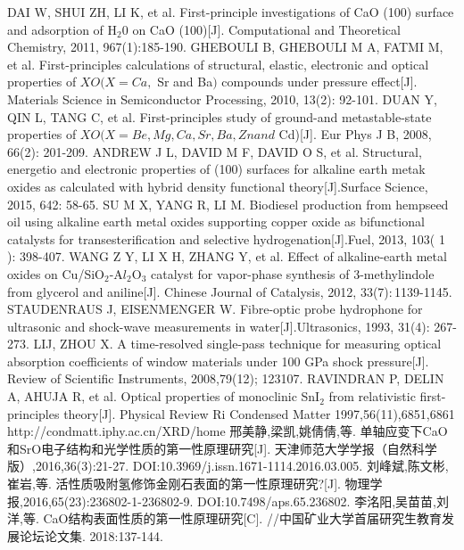 \documentclass[12pt,a4paper]{article}%
\begin{document}
	\begin{thebibliography}{99}%
		 DAI W, SHUI ZH, LI K, et al. First-principle investigations of CaO
		(100) surface and adsorption of H$_2$0 on CaO (100)[J]. Computational and Theoretical Chemistry, 2011, 967(1):185-190.
		 GHEBOULI B, GHEBOULI M A, FATMI M, et al. First-principles calculations of structural, elastic, electronic and optical properties of $XO ( X= Ca , $ Sr and Ba$) $ compounds under pressure effect[J]. Materials Science in Semiconductor Processing, 2010, 13(2): 92-101.
		 DUAN Y, QIN L, TANG C, et al. First-principles study of ground-and metastable-state properties of $XO(X=Be,Mg,Ca,Sr,Ba,Znand$ Cd)[J]. Eur Phys J B, 2008, 66(2): 201-209.
		  ANDREW J L, DAVID M F, DAVID O S, et al. Structural, energetio and electronic properties of (100) surfaces for alkaline earth metak oxides as calculated with hybrid density functional theory[J].Surface Science, 2015, 642: 58-65.
		  SU M X, YANG R, LI M. Biodiesel production from hempseed oil using alkaline earth metal oxides supporting copper oxide as bifunctional catalysts for transesterification and selective hydrogenation[J].Fuel, 2013, 103( 1 ): 398-407.
		 WANG Z Y, LI X H, ZHANG Y, et al. Effect of alkaline-earth metal oxides on Cu/SiO$_2$-A$l_2$O$_3$ catalyst for vapor-phase synthesis of 3-methylindole from glycerol and aniline[J]. Chinese Journal of Catalysis, 2012, 33(7)$\colon$1139-1145.
		 STAUDENRAUS J, EISENMENGER W. Fibre-optic probe hydrophone for ultrasonic and shock-wave measurements in water[J].Ultrasonics, 1993, 31(4): 267-273.
		 LIJ, ZHOU X. A time-resolved single-pass technique for measuring optical absorption coefficients of window materials under 100 GPa shock pressure[J]. Review of Scientific Instruments, 2008,79(12); 123107.
		  RAVINDRAN P, DELIN A, AHUJA R, et al. Optical properties of monoclinic SnI$_2$ from relativistic first-principles theory[J]. Physical Review Ri Condensed Matter 1997,56(11),6851,6861
		 http://condmatt.iphy.ac.cn/XRD/home
		 邢美静,梁凯,姚倩倩,等. 单轴应变下CaO和SrO电子结构和光学性质的第一性原理研究[J]. 天津师范大学学报（自然科学版）,2016,36(3):21-27. DOI:10.3969/j.issn.1671-1114.2016.03.005.
		 刘峰斌,陈文彬,崔岩,等. 活性质吸附氢修饰金刚石表面的第一性原理研究?[J]. 物理学报,2016,65(23):236802-1-236802-9. DOI:10.7498/aps.65.236802.
		 李洺阳,吴苗苗,刘洋,等. CaO结构表面性质的第一性原理研究[C]. //中国矿业大学首届研究生教育发展论坛论文集. 2018:137-144.

\end{thebibliography}
\end{document}
